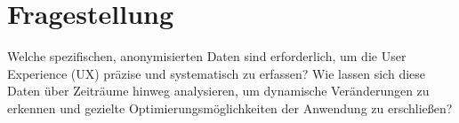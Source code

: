 \documentclass[12pt,oneside]{article}
\begin{document}
\section{Fragestellung}
Welche spezifischen, anonymisierten Daten sind erforderlich, um die User Experience (UX) präzise und systematisch zu erfassen? Wie lassen sich diese Daten über Zeiträume hinweg analysieren, um dynamische Veränderungen zu erkennen und gezielte Optimierungsmöglichkeiten der Anwendung zu erschließen?

 
\end{document}
